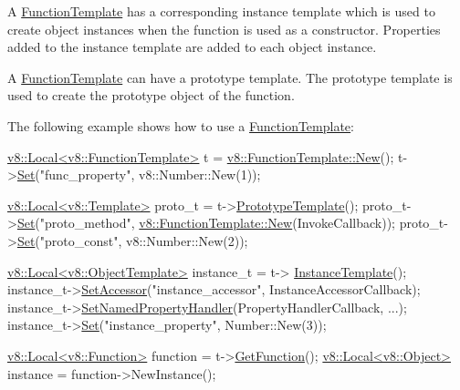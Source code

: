A \hyperlink{classv8_1_1_function_template}{Function\+Template} has a corresponding instance template which is used to create object instances when the function is used as a constructor. Properties added to the instance template are added to each object instance.

A \hyperlink{classv8_1_1_function_template}{Function\+Template} can have a prototype template. The prototype template is used to create the prototype object of the function.

The following example shows how to use a \hyperlink{classv8_1_1_function_template}{Function\+Template}\+:


\begin{DoxyCode}
\hyperlink{classv8_1_1_local}{v8::Local<v8::FunctionTemplate>} t = 
      \hyperlink{classv8_1_1_function_template_af9012aee4a102c4018fec8e9532cb996}{v8::FunctionTemplate::New}();
t->\hyperlink{classv8_1_1_template_a8a29557db5d0bc980752084b925a9b01}{Set}(\textcolor{stringliteral}{"func\_property"}, v8::Number::New(1));

\hyperlink{classv8_1_1_local}{v8::Local<v8::Template>} proto\_t = t->\hyperlink{classv8_1_1_function_template_aa2bcc2652b5f0fdbc666d943ccf72021}{PrototypeTemplate}();
proto\_t->\hyperlink{classv8_1_1_template_a8a29557db5d0bc980752084b925a9b01}{Set}(\textcolor{stringliteral}{"proto\_method"}, \hyperlink{classv8_1_1_function_template_af9012aee4a102c4018fec8e9532cb996}{v8::FunctionTemplate::New}(InvokeCallback));
proto\_t->\hyperlink{classv8_1_1_template_a8a29557db5d0bc980752084b925a9b01}{Set}(\textcolor{stringliteral}{"proto\_const"}, v8::Number::New(2));

\hyperlink{classv8_1_1_local}{v8::Local<v8::ObjectTemplate>} instance\_t = t->
      \hyperlink{classv8_1_1_function_template_a00dd9725566908e8fd14064542f5a781}{InstanceTemplate}();
instance\_t->\hyperlink{classv8_1_1_object_template_a944ce96b6b65d571f8d682407b70d484}{SetAccessor}(\textcolor{stringliteral}{"instance\_accessor"}, InstanceAccessorCallback);
instance\_t->\hyperlink{classv8_1_1_object_template_aa80e9db593d8b954c4153082dc7a439d}{SetNamedPropertyHandler}(PropertyHandlerCallback, ...);
instance\_t->\hyperlink{classv8_1_1_template_a8a29557db5d0bc980752084b925a9b01}{Set}(\textcolor{stringliteral}{"instance\_property"}, Number::New(3));

\hyperlink{classv8_1_1_local}{v8::Local<v8::Function>} \textcolor{keyword}{function} = t->\hyperlink{classv8_1_1_function_template_a3b8e5e214b2ee34c36138961ebac696a}{GetFunction}();
\hyperlink{classv8_1_1_local}{v8::Local<v8::Object>} instance = \textcolor{keyword}{function}->NewInstance();
\end{DoxyCode}


